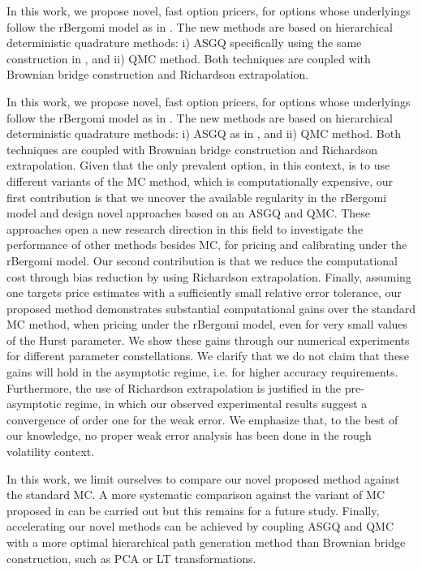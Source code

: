 In this work,  we propose  novel, fast option pricers,  for options whose underlyings  follow the rBergomi model as in \cite{bayer2016pricing}.  The new methods  are based on hierarchical deterministic quadrature methods:  i) ASGQ specifically using the same construction in \cite{haji2016multi}, and ii) QMC method. Both techniques are coupled with Brownian bridge construction and Richardson extrapolation.

In this work,  we propose  novel, fast option pricers,  for options whose underlyings  follow the rBergomi model as in \cite{bayer2016pricing}.  The new methods  are based on hierarchical deterministic quadrature methods:  i) ASGQ as in \cite{haji2016multi}, and ii) QMC method. Both techniques are coupled with Brownian bridge construction and Richardson extrapolation.
Given that the only prevalent option, in this context, is to use different variants of the MC method, which is computationally expensive, our first contribution  is that we uncover the available regularity in the rBergomi model and  design novel  approaches based on an ASGQ and QMC. These approaches  open a new research direction in this field to investigate the performance of other methods besides MC, for pricing and calibrating under the rBergomi model. Our second contribution is that we reduce the computational cost  through bias reduction by using Richardson extrapolation. Finally, assuming one targets price estimates with a sufficiently small relative error tolerance, our proposed method demonstrates substantial computational gains  over the standard MC method, when pricing under the rBergomi model, even for very small values of the Hurst parameter. We show  these gains through our numerical experiments for  different parameter constellations.  We clarify that we do not claim that these gains will hold in the asymptotic regime, i.e.  for higher accuracy requirements. Furthermore, the use of Richardson extrapolation is justified in the pre-asymptotic regime, in which our observed experimental results suggest a convergence of order one for the weak error. We emphasize that, to the best of our knowledge, no proper weak error analysis has been done in the rough volatility context. 

In this work, we limit ourselves to compare our novel proposed method against the standard MC. A more systematic comparison against the variant of MC proposed in \cite{mccrickerd2018turbocharging}  can be carried out but this remains for a future study. Finally, accelerating  our novel  methods can be achieved  by coupling ASGQ and QMC with a more optimal hierarchical path generation method than Brownian bridge construction, such as PCA or LT transformations.
